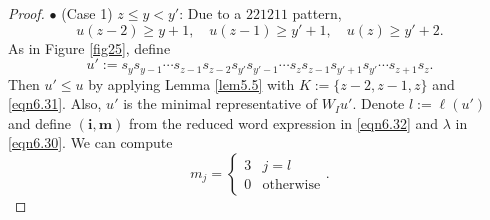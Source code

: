 \documentclass[12pt]{amsart}
\theoremstyle{definition}
\theoremstyle{remark}
\begin{document}
\begin{proof}
$\bullet$ (Case 1) $z \leq y< y'$: Due to a $221211$ pattern,
\begin{equation}\label{eqn6.31}
u(z-2) \geq y+1, \quad u(z-1) \geq y'+1, \quad u(z) \geq y'+2.
\end{equation}
As in Figure \ref{fig25}, define
\begin{equation}\label{eqn6.32}
u':=s_{y} s_{y-1} \cdots s_{z-1}s_{z-2} s_{y'} s_{y'-1} \cdots s_z s_{z-1} s_{y'+1} s_{y'} \cdots s_{z+1 }s_z.
\end{equation}
Then $u' \leq u$ by applying Lemma \ref{lem5.5} with $K:=\{z-2 , z-1 , z \}$ and \eqref{eqn6.31}. Also, $u'$ is the minimal representative of $W_Iu'$. Denote $l:= \ell (u')$ and define $(\mathbf{i}, \mathbf{m})$ from the reduced word expression in \eqref{eqn6.32} and $\lambda$ in \eqref{eqn6.30}. We can compute
\begin{equation}\label{eqn6.33}
m_j = 
\begin{cases}
3 & j = l \\
0 & \text{otherwise}
\end{cases}
.
\end{equation}


\end{proof}
\end{document}
